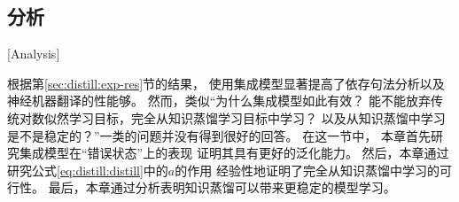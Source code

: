 %
%
%
%

%
%

\subsection{分析}[Analysis]\label{sec:analysis}

根据第\ref{sec:distill:exp-res}节的结果，
使用集成模型显著提高了依存句法分析以及神经机器翻译的性能够。
然而，类似``为什么集成模型如此有效？
能不能放弃传统对数似然学习目标，完全从知识蒸馏学习目标中学习？
以及从知识蒸馏中学习是不是稳定的？''一类的问题并没有得到很好的回答。
在这一节中，
本章首先研究集成模型在``错误状态''上的表现
证明其具有更好的泛化能力。
然后，本章通过研究公式\ref{eq:distill:distill}中的$a$的作用
经验性地证明了完全从知识蒸馏中学习的可行性。
最后，本章通过分析表明知识蒸馏可以带来更稳定的模型学习。

